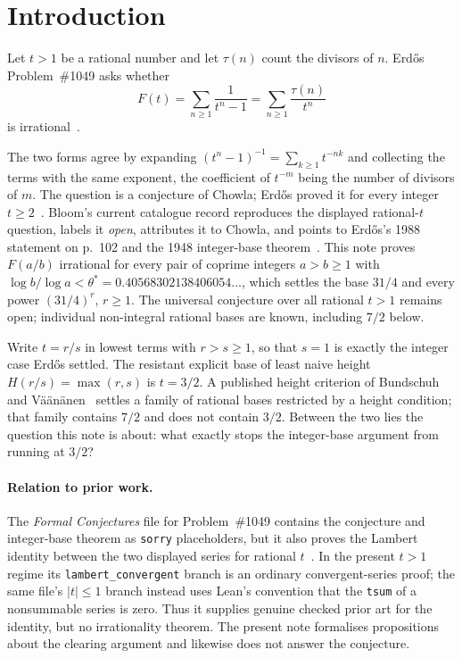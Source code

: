 \section{Introduction}\label{long1049:sec:problem}

Let $t>1$ be a rational number and let $\tau(n)$ count the divisors of $n$.
Erd\H{o}s Problem~\#1049 asks whether
\[
 F(t)=\sum_{n\ge1}\frac{1}{t^{n}-1}=\sum_{n\ge1}\frac{\tau(n)}{t^{n}}
\]
is irrational~\cite[p.~102]{erdos1988}.

The two forms agree by expanding
$(t^{n}-1)^{-1}=\sum_{k\ge1}t^{-nk}$ and collecting the terms with the same
exponent, the coefficient of $t^{-m}$ being the number of divisors of $m$.
The question is a conjecture of Chowla; Erd\H{o}s proved it for every integer
$t\ge2$~\cite{erdos1948}.  Bloom's current catalogue record reproduces the
displayed rational-\(t\) question, labels it \emph{open}, attributes it to
Chowla, and points to Erd\H{o}s's 1988 statement on p.~102 and the 1948
integer-base theorem~\cite{erdosproblems}.  This note proves $F(a/b)$
irrational for every pair of coprime integers $a>b\ge1$ with
$\log b/\log a<\theta^{*}=0.40568302138406054\ldots$, which settles the base
$31/4$ and every power $(31/4)^{r}$, $r\ge1$.  The universal conjecture over
all rational $t>1$ remains open; individual non-integral rational bases are
known, including $7/2$ below.

Write $t=r/s$ in lowest terms with $r>s\ge1$, so that $s=1$ is exactly the
integer case Erd\H{o}s settled.  The resistant explicit base of least naive
height $H(r/s)=\max(r,s)$ is $t=3/2$.  A published height criterion of Bundschuh and
V\"a\"an\"anen~\cite[Thm.~2, p.~177; hypotheses pp.~175--176]{bv1994}
settles a family of rational bases restricted by a
height condition; that family contains $7/2$ and does not contain $3/2$.
Between the two lies the question this note is about: what exactly stops the
integer-base argument from running at $3/2$?

\paragraph{Relation to prior work.}
The \emph{Formal Conjectures} file for Problem~\#1049 contains the conjecture
and integer-base theorem as \texttt{sorry} placeholders, but it also proves
the Lambert identity between the two displayed series for rational
$t$~\cite{formalconjectures1049}.  In the present $t>1$ regime its
\texttt{lambert\_convergent} branch is an ordinary convergent-series proof;
the same file's $|t|\le1$ branch instead uses Lean's convention that the
\texttt{tsum} of a nonsummable series is zero.  Thus it supplies genuine
checked prior art for the identity, but no irrationality theorem.  The present
note formalises propositions about the clearing argument and likewise does
not answer the conjecture.

